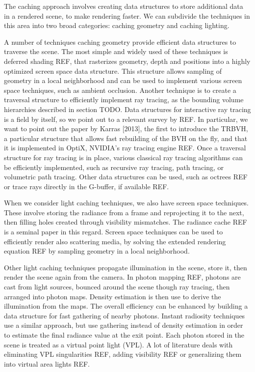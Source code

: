 The caching approach involves creating data structures to store additional data in a rendered scene, to make rendering faster. We can subdivide the techniques in this area into two broad categories: caching geometry and caching lighting.

A number of techniques caching geometry provide efficient data structures to traverse the scene. The most simple and widely used of these techniques is deferred shading REF, that rasterizes geometry, depth and positions into a highly optimized screen space data structure. This structure allows sampling of geometry in a local neighborhood and can be used to implement various screen space techniques, such as ambient occlusion. Another technique is to create a traversal structure to efficiently implement ray tracing, as the bounding volume hierarchies described in section TODO. Data structures for interactive ray tracing is a field by itself, so we point out to a relevant survey by REF. In particular, we want to point out the paper by Karras [2013], the first to introduce the TRBVH, a particular structure that allows fast rebuilding of the BVH on the fly, and that it is implemented in OptiX, NVIDIA's ray tracing engine REF. Once a traversal structure for ray tracing is in place, various classical ray tracing algorithms can be efficiently implemented, such as recursive ray tracing, path tracing, or volumetric path tracing. Other data structures can be used, such as octrees REF or trace rays directly in the G-buffer, if available REF.

When we consider light caching techniques, we also have screen space techniques. These involve storing the radiance from a frame and reprojecting it to the next, then filling holes created through visibility mismatches. The radiance cache REF is a seminal paper in this regard. Screen space techniques can be used to efficiently render also scattering media, by solving the extended rendering equation REF by sampling geometry in a local neighborhood.

Other light caching techniques propagate illumination in the scene, store it, then render the scene again from the camera. In photon mapping REF, photons are cast from light sources, bounced around the scene though ray tracing, then arranged into photon maps. Density estimation is then use to derive the illumination from the maps. The overall efficiency can be enhanced by building a data structure for fast gathering of nearby photons. Instant radiosity techniques use a similar approach, but use gathering instead of density estimation in order to estimate the final radiance value at the exit point. Each photon stored in the scene is treated as a virtual point light (VPL). A lot of literature deals with eliminating VPL singularities REF, adding visibility REF or generalizing them into virtual area lights REF.

